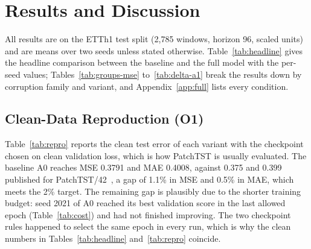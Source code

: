 \section{Results and Discussion}
\label{sec:results}

All results are on the ETTh1 test split (2,785 windows, horizon 96, scaled units) and are means over two seeds unless stated otherwise. Table~\ref{tab:headline} gives the headline comparison between the baseline and the full model with the per-seed values; Tables~\ref{tab:groups-mse} to~\ref{tab:delta-a1} break the results down by corruption family and variant, and Appendix~\ref{app:full} lists every condition.

\begin{table}[!t]
\centering
\caption{Headline Results: PatchTST (A0) Versus RA-PatchTST (A4)}
\label{tab:headline}
\footnotesize
{}
\end{table}

\subsection{Clean-Data Reproduction (O1)}

Table~\ref{tab:repro} reports the clean test error of each variant with the checkpoint chosen on clean validation loss, which is how PatchTST is usually evaluated. The baseline A0 reaches MSE 0.3791 and MAE 0.4008, against 0.375 and 0.399 published for PatchTST/42~\cite{patchtst}, a gap of 1.1\% in MSE and 0.5\% in MAE, which meets the 2\% target. The remaining gap is plausibly due to the shorter training budget: seed 2021 of A0 reached its best validation score in the last allowed epoch (Table~\ref{tab:cost}) and had not finished improving. The two checkpoint rules happened to select the same epoch in every run, which is why the clean numbers in Tables~\ref{tab:headline} and~\ref{tab:repro} coincide.

\begin{table}[!t]
\centering
\caption{Clean Test Error With the Clean-Validation Checkpoint, Against the Published PatchTST/42 Result (MSE 0.375, MAE 0.399)}
\label{tab:repro}
\footnotesize
{}
\end{table}

